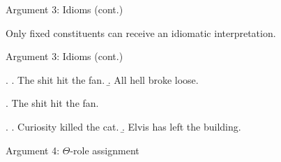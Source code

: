 \documentclass[ignorenonframetext,8pt,aspectratio=169]{beamer}
\begin{document}
\begin{frame}[t,plain]{Argument 3: Idioms (cont.)}

\vspace{40pt}


Only fixed constituents can receive an idiomatic interpretation.

\end{frame}

\begin{frame}[t,plain]{Argument 3: Idioms (cont.)}

\ex. \a. The shit hit the fan.
\b. All hell broke loose.

\bigskip

\ex. The shit  hit the fan.

\vspace{70pt}

\ex. \a. Curiosity killed the cat.
\b. Elvis has left the building.

\end{frame}

\begin{frame}[t,plain]{Argument 4: $\Theta$-role assignment}
\bigskip

\begin{center}
\end{center}
\end{frame}
\end{document}
